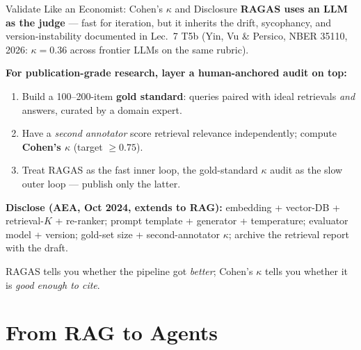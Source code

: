 \begin{frame}{Validate Like an Economist: Cohen's $\kappa$ and Disclosure}
\textbf{RAGAS uses an LLM as the judge} --- fast for iteration, but it inherits the drift, sycophancy, and version-instability documented in Lec.\ 7 T5b (Yin, Vu \& Persico, NBER 35110, 2026: $\kappa = 0.36$ across frontier LLMs on the same rubric).

\smallskip
\textbf{For publication-grade research, layer a human-anchored audit on top:}
\begin{enumerate}\small
\item Build a 100--200-item \textbf{gold standard}: queries paired with ideal retrievals \emph{and} answers, curated by a domain expert.
\item Have a \emph{second annotator} score retrieval relevance independently; compute \textbf{Cohen's $\kappa$} (target $\geq 0.75$).
\item Treat RAGAS as the fast inner loop, the gold-standard $\kappa$ audit as the slow outer loop --- publish only the latter.
\end{enumerate}

\smallskip
{\footnotesize\textbf{Disclose (AEA, Oct 2024, extends to RAG):} embedding + vector-DB + retrieval-$K$ + re-ranker; prompt template + generator + temperature; evaluator model + version; gold-set size + second-annotator $\kappa$; archive the retrieval report with the draft.\par}

\smallskip
\begin{takeawaybox}
RAGAS tells you whether the pipeline got \emph{better}; Cohen's $\kappa$ tells you whether it is \emph{good enough to cite}.
\end{takeawaybox}
\end{frame}

\section{From RAG to Agents}

